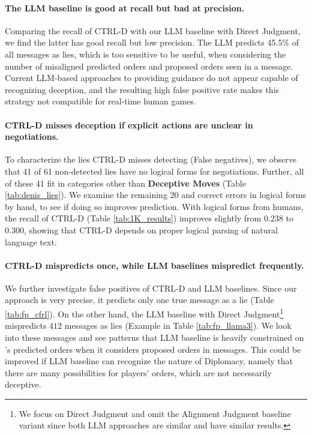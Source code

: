
\paragraph{The LLM baseline is good at recall but bad at precision.} Comparing the recall of CTRL-D with our LLM baseline with Direct Judgment, we find the latter has good recall but low precision. The LLM predicts 45.5\% of all messages as lies, which is too sensitive to be useful, when considering the number of misaligned \cicero predicted orders and proposed orders seen in a message. Current LLM-based approaches to providing guidance do not appear capable of recognizing deception, and the resulting high false positive rate makes this strategy not compatible for real-time human games. 

\paragraph{CTRL-D misses deception if explicit actions are unclear in negotiations.} To characterize the lies CTRL-D misses detecting (False negatives), we observe that 41 of 61 non-detected lies have no logical forms for negotiations. Further, all of these 41 fit in categories other than \textbf{Deceptive Moves} (Table \ref{tab:denis_lies}). We examine the remaining 20 and correct errors in logical forms by hand, to see if doing so improves prediction. With logical forms from humans, the recall of CTRL-D (Table \ref{tab:1K_results}) improves slightly from \(0.238\) to \(0.300\), showing that CTRL-D depends on proper logical parsing of natural language text.


\paragraph{CTRL-D mispredicts once, while LLM baselines mispredict frequently.} We further investigate false positives of CTRL-D and LLM baselines. Since our approach is very precise, it predicts only one true message as a lie (Table \ref{tab:fp_cfrl}). On the other hand, the LLM baseline with Direct Judgment\footnote{We focus on Direct Judgment and omit the Alignment Judgment baseline variant since both LLM approaches are similar and have similar results.} mispredicts \(412\) messages as lies (Example in Table \ref{tab:fp_llama3}). We look into these messages and see patterns that LLM baseline is heavily constrained on \cicero{}'s predicted orders when it considers proposed orders in messages. This could be improved if LLM baseline can recognize the nature of Diplomacy, namely that there are many possibilities for players' orders, which are not necessarily deceptive. 

